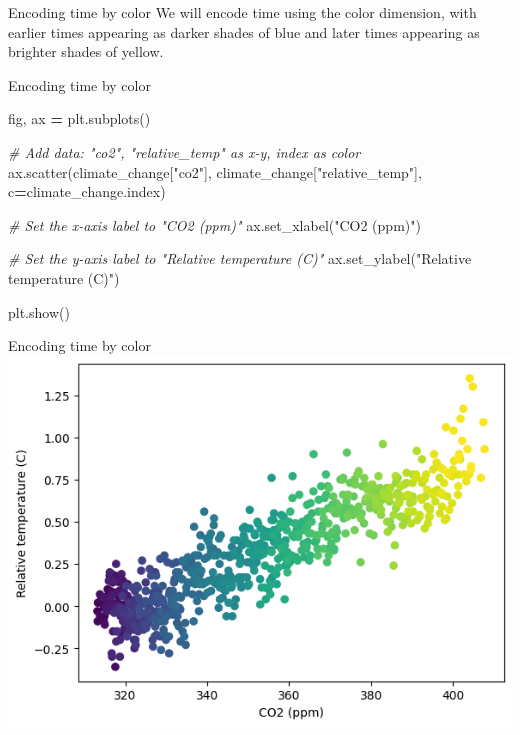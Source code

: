 \documentclass[
  ignorenonframetext,
]{beamer}
\newenvironment{Shaded}{\begin{snugshade}}{\end{snugshade}}
\newcommand{\CommentTok}[1]{\textcolor[rgb]{0.56,0.35,0.01}{\textit{#1}}}
\newcommand{\NormalTok}[1]{#1}
\newcommand{\OperatorTok}[1]{\textcolor[rgb]{0.81,0.36,0.00}{\textbf{#1}}}
\newcommand{\StringTok}[1]{\textcolor[rgb]{0.31,0.60,0.02}{#1}}
\begin{document}
\begin{frame}{Encoding time by color}
\label{encoding-time-by-color-1}
We will encode time using the color dimension, with earlier times
appearing as darker shades of blue and later times appearing as brighter
shades of yellow.
\end{frame}

\begin{frame}[fragile]{Encoding time by color}
\label{encoding-time-by-color-2}

\begin{Shaded}
\begin{Highlighting}[]
\NormalTok{fig, ax }\OperatorTok{=}\NormalTok{ plt.subplots()}

\CommentTok{\# Add data: "co2", "relative\_temp" as x{-}y, index as color}
\NormalTok{ax.scatter(climate\_change[}\StringTok{"co2"}\NormalTok{], climate\_change[}\StringTok{"relative\_temp"}\NormalTok{], c}\OperatorTok{=}\NormalTok{climate\_change.index)}

\CommentTok{\# Set the x{-}axis label to "CO2 (ppm)"}
\NormalTok{ax.set\_xlabel(}\StringTok{"CO2 (ppm)"}\NormalTok{)}

\CommentTok{\# Set the y{-}axis label to "Relative temperature (C)"}
\NormalTok{ax.set\_ylabel(}\StringTok{"Relative temperature (C)"}\NormalTok{)}

\NormalTok{plt.show()}
\end{Highlighting}
\end{Shaded}
\end{frame}

\begin{frame}{Encoding time by color}
\label{encoding-time-by-color-3}
\includegraphics{../images/im248}
\end{frame}
\end{document}
